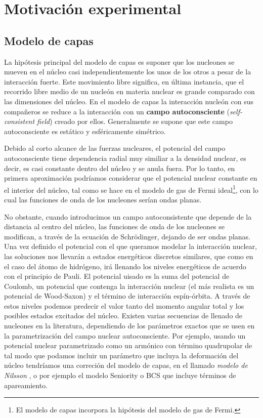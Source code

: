 \section{Motivación experimental}



\subsection{Modelo de capas}

La hipótesis principal del modelo de capas es suponer que los nucleones se mueven en el núcleo casi independientemente los unos de los otros a pesar de la interacción fuerte. Este movimiento libre significa, en última instancia, que el recorrido libre medio de un nucleón en materia nuclear es grande comparado con las dimensiones del núcleo. En el modelo de capas la interacción nucleón con sus compañeros se reduce a la interacción con un \textbf{campo autoconsciente} (\textit{self-consistent field}) creado por ellos. Generalmente se supone que este campo autoconsciente es estático y esféricamente simétrico.

Debido al corto alcance de las fuerzas nucleares, el potencial del campo autoconsciente tiene dependencia radial muy similiar a la densidad nuclear, es decir, es casi constante dentro del núcleo y se anula fuera. Por lo tanto, en primera aproximación podríamos considerar que el potencial nuclear constante en el interior del núcleo, tal como se hace en el modelo de gas de Fermi ideal\footnote{El modelo de capas incorpora la hipótesis del modelo de gas de Fermi.}, con lo cual las funciones de onda de los nucleones serían ondas planas.

No obstante, cuando introducimos un campo autoconsistente que depende de la distancia al centro del núcleo, las funciones de onda de los nucleones se modifican, a través de la ecuación de Schrödinger, dejando de ser ondas planas. Una vez definido el potencial con el que queramos modelar la interacción nuclear, las soluciones nos llevarán a estados energéticos discretos similares, que como en el caso del átomo de hidrógeno, irá llenando los niveles energéticos de acuerdo con el principio de Pauli. El potencial uisado es la suma del potencial de Coulomb, un potencial que contenga la interacción nuclear (el más realista es un potencial de Wood-Saxon) y el término de interacción espín-órbita. A través de estos niveles podemos predecir el valor tanto del momento angular total y los posibles estados excitados del núcleo. Existen varias secuencias de llenado de nucleones en la literatura, dependiendo de los parámetros exactos que se usen en la parametrización del campo nuclear autoconsciente. Por ejemplo, usando un potencial nuclear parametrizado como un armónico con término quadrupolar de tal modo que podamos incluir un parámetro que incluya la deformación del núcleo tendríamos una correción del modelo de capas, en el llamado \textit{modelo de Nilsson} \cite{Nilsson:212345}, o por ejemplo el modelo Seniority o BCS \cite{Broglia} que incluye términos de apareamiento. 


